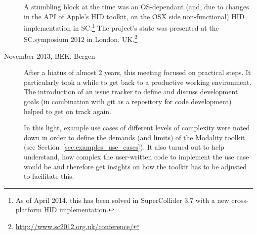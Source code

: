\documentclass{article}
\begin{document}
\begin{description}
A stumbling block at the time was an OS-dependant (and, due to changes in the API of Apple's HID toolkit, on the OSX side non-functional) HID implementation in SC.\footnote{As of April 2014, this has been solved in SuperCollider 3.7 with a new cross-platform HID implementation.}
The project's state was presented at the SC.symposium 2012 in London, UK.\footnote{\url{http://www.sc2012.org.uk/conference/}}
%	



	\item[November 2013, BEK, Bergen] After a hiatus of almost 2 years, this meeting focused on practical steps. 
	It particularly took a while to get back to a productive working environment.
	The introduction of an issue tracker to define and discuss development goals (in combination with git as a repository for code development) helped to get on track again.

	In this light, example use cases of different levels of complexity were noted down in order to define the demands (and limits) of the Modality toolkit (see Section~\ref{sec:examples_use_cases}).
	It also turned out to help understand, how complex the user-written code to implement the use case would be and therefore get insights on how the toolkit has to be adjusted to facilitate this. 


\end{description}
\end{document}
